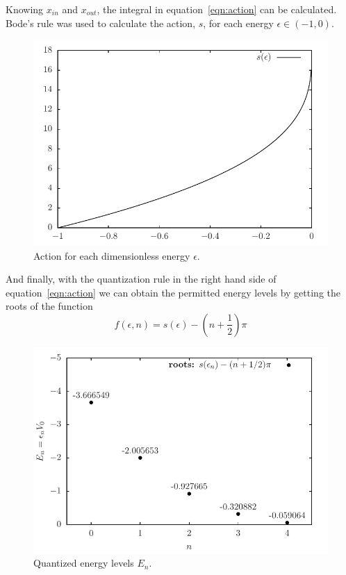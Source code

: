 \documentclass[11pt]{article}
\begin{document}
Knowing $x_{in}$ and $x_{out}$, the integral in equation~\ref{eqn:action} can be calculated. Bode's rule was used to calculate the action, $s$, for each energy $\epsilon\in(-1,0)$.
\begin{figure}[H]
  \centering
  \includegraphics[width=\linewidth]{action-LJ}
  \caption{Action for each dimensionless energy $\epsilon$.}
\label{fig:action-Lj}
\end{figure}

And finally, with the quantization rule in the right hand side of equation~\ref{eqn:action} we can obtain the permitted energy levels by getting the roots of the function
\begin{equation*}
  f(\epsilon, n) = s(\epsilon) - \left(n+\frac{1}{2}\right)\pi
\end{equation*}
\begin{figure}[H]
  \centering
  \includegraphics[width=\linewidth]{quantizedEnergy-LJ}
  \caption{Quantized energy levels $E_n$.}
\label{fig:energy-LJ}
\end{figure}
\end{document}

